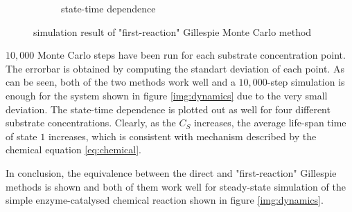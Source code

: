 \begin{figure}[H]
\begin{subfigure}{0.46\textwidth}
		\caption{state-time dependence}
		\end{subfigure}{}
		\caption{simulation result of "first-reaction" Gillespie Monte Carlo method}
		\label{img:first-reaction}
	\end{figure}

	$10,000$ Monte Carlo steps have been run for each substrate concentration point. The errorbar is obtained by computing the standart deviation of each point. As can be seen, both of the two methods work well and a $10,000$-step simulation is enough for the system shown in figure \ref{img:dynamics} due to the very small deviation. The state-time dependence is plotted out as well for four different substrate concentrations. Clearly, as the $C_S$ increases, the average life-span time of state $1$ increases, which is consistent with mechanism described by the chemical equation \eqref{eq:chemical}.

	In conclusion, the equivalence between the direct and "first-reaction" Gillespie methods is shown and both of them work well for steady-state simulation of the simple enzyme-catalysed chemical reaction shown in figure \ref{img:dynamics}.





